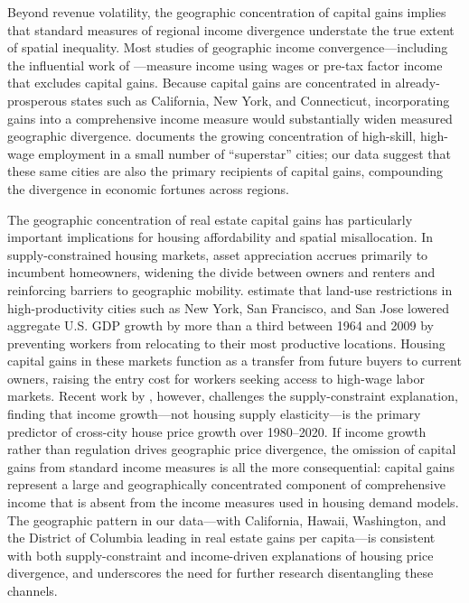 \documentclass[12pt]{article}
\begin{document}
Beyond revenue volatility, the geographic concentration of capital gains implies that standard measures of regional income divergence understate the true extent of spatial inequality. Most studies of geographic income convergence---including the influential work of \citet{ganong2017regional}---measure income using wages or pre-tax factor income that excludes capital gains. Because capital gains are concentrated in already-prosperous states such as California, New York, and Connecticut, incorporating gains into a comprehensive income measure would substantially widen measured geographic divergence. \citet{autor2019work} documents the growing concentration of high-skill, high-wage employment in a small number of ``superstar'' cities; our data suggest that these same cities are also the primary recipients of capital gains, compounding the divergence in economic fortunes across regions.

The geographic concentration of real estate capital gains has particularly important implications for housing affordability and spatial misallocation. In supply-constrained housing markets, asset appreciation accrues primarily to incumbent homeowners, widening the divide between owners and renters and reinforcing barriers to geographic mobility. \citet{hsieh2019housing} estimate that land-use restrictions in high-productivity cities such as New York, San Francisco, and San Jose lowered aggregate U.S. GDP growth by more than a third between 1964 and 2009 by preventing workers from relocating to their most productive locations. Housing capital gains in these markets function as a transfer from future buyers to current owners, raising the entry cost for workers seeking access to high-wage labor markets. Recent work by \citet{louie2025supply}, however, challenges the supply-constraint explanation, finding that income growth---not housing supply elasticity---is the primary predictor of cross-city house price growth over 1980--2020. If income growth rather than regulation drives geographic price divergence, the omission of capital gains from standard income measures is all the more consequential: capital gains represent a large and geographically concentrated component of comprehensive income that is absent from the income measures used in housing demand models. The geographic pattern in our data---with California, Hawaii, Washington, and the District of Columbia leading in real estate gains per capita---is consistent with both supply-constraint and income-driven explanations of housing price divergence, and underscores the need for further research disentangling these channels.
\end{document}
